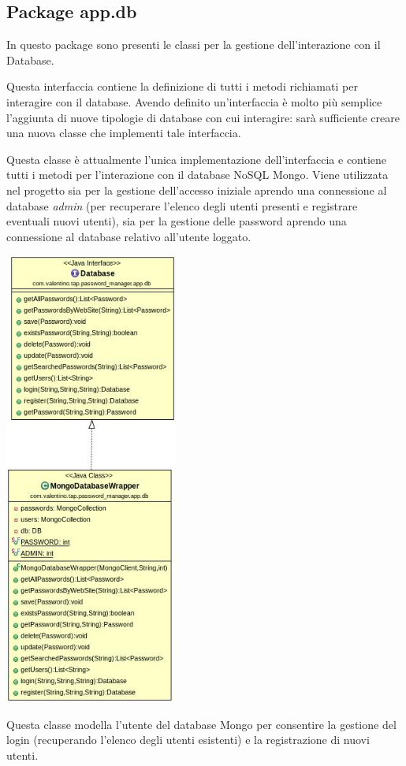 \subsection{Package app.db}
In questo package sono presenti le classi per la gestione dell'interazione con il Database.
\begin{myitemize}{}
	\item[\class{Database}] Questa interfaccia contiene la definizione di tutti i metodi richiamati per interagire con il database. Avendo definito un'interfaccia è molto più semplice l'aggiunta di nuove tipologie di database con cui interagire: sarà sufficiente creare una nuova classe che implementi tale interfaccia.

	\item[\class{MongoDatabaseWrapper}] Questa classe è attualmente l'unica implementazione dell'interfaccia  e contiene tutti i metodi per l'interazione con il database NoSQL Mongo. Viene utilizzata nel progetto sia per la gestione dell'accesso iniziale aprendo una connessione al database \emph{admin} (per recuperare l'elenco degli utenti presenti e registrare eventuali nuovi utenti), sia per la gestione delle password aprendo una connessione al database relativo all'utente loggato.
		\begin{center} \includegraphics[height=15cm]{Immagini/DB.jpg} \end{center}
	
	\item[\class{DBUser}] Questa classe modella l'utente del database Mongo per consentire la gestione del login (recuperando l'elenco degli utenti esistenti) e la registrazione di nuovi utenti.
\end{myitemize}	
\newpage
